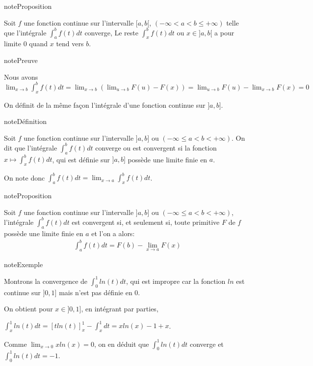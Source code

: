 \documentclass[letterpaper,10pt,french]{sphinxmanual}
\begin{document}
\begin{sphinxadmonition}{note}{Proposition}

\sphinxAtStartPar
Soit \(f\) une fonction continue sur l’intervalle \([a, b[\), \((-\infty <a < b \leq +\infty)\) telle que l’intégrale \(\int_a^b f(t)dt\) converge, Le reste \(\int_x^b f(t)dt\) ou \(x\in ]a, b[\) a pour limite 0 quand \(x\) tend vers \(b\).
\end{sphinxadmonition}

\begin{sphinxadmonition}{note}{Preuve}

\sphinxAtStartPar
Nous avons \(\lim_{x\to b} \int_x^b f(t)dt = \lim_{x\to b} ( \lim_{u\to b} F(u)- F(x)) = \lim_{u\to b} F(u)- \lim_{x\to b}F(x) =0\)
\end{sphinxadmonition}

\sphinxAtStartPar
On définit de la même façon l’intégrale d’une fonction continue sur \(]a, b]\).

\begin{sphinxadmonition}{note}{Définition}

\sphinxAtStartPar
Soit \(f\) une fonction continue sur l’intervalle \(]a, b]\) ou \((-\infty \leq a < b < +\infty)\).
On dit que l’intégrale \(\int_a^b f(t)dt\) converge ou est convergent si la fonction \(x\mapsto \int_x^b f(t)dt\), qui est définie sur \(]a, b]\)  possède une limite finie en \(a\).
\end{sphinxadmonition}

\sphinxAtStartPar
On note donc \(\int_a^b f(t)dt = \lim_{x\to a} \int_x^b f(t)dt\).

\begin{sphinxadmonition}{note}{Proposition}

\sphinxAtStartPar
Soit \(f\) une fonction continue sur l’intervalle \(]a, b]\) ou \((-\infty \leq a < b < +\infty)\), l’intégrale \(\int_a^b f(t)dt\) est convergent si, et seulement si, toute primitive \(F\) de \(f\) possède une limite finie en \(a\) et l’on a alors:
\begin{equation*}
\begin{split}
\int_a^b f(t)dt = F(b) -\lim_{x\to a}F(x)
\end{split}
\end{equation*}\end{sphinxadmonition}

\begin{sphinxadmonition}{note}{Exemple}

\sphinxAtStartPar
Montrons la convergence de \(\int_0^1 ln(t)dt\), qui est impropre car la fonction \(ln\) est continue sur \(]0, 1]\) mais n’est pas définie en 0.

\sphinxAtStartPar
On obtient pour \(x\in ]0, 1]\), en intégrant par parties,

\sphinxAtStartPar
\(\int_x^1 ln(t)dt=[tln(t)]_{x}^1 - \int_x^1dt = xln(x)-1 + x\).

\sphinxAtStartPar
Comme \(\lim_{x\to 0} xln(x)=0\), on en déduit que \(\int_0^1ln(t)dt \) converge et \(\int_0^1ln(t)dt =-1\).
\end{sphinxadmonition}
\end{document}
